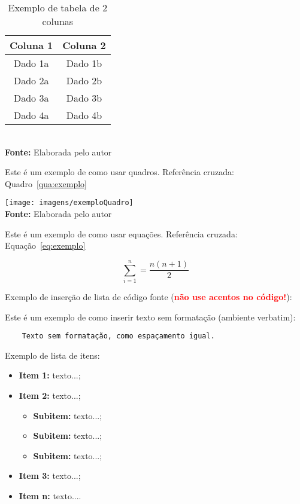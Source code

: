\FloatBarrier
\begin{table}[!htbp]
\centering
\caption{Exemplo de tabela de 2 colunas}
	\begin{tabular}{ c | c }
		\hline
		\textbf{Coluna 1} & \textbf{Coluna 2} \\ \hline
		Dado 1a           & Dado 1b           \\ \hline
		Dado 2a           & Dado 2b           \\ \hline
		Dado 3a           & Dado 3b           \\ \hline
		Dado 4a           & Dado 4b           \\ \hline
	\end{tabular}
	\\ \vspace{0.2cm}
	\textbf{Fonte:} Elaborada pelo autor
	\label{tab:exemplo}
\end{table}
\FloatBarrier


Este é um exemplo de como usar quadros. Referência cruzada: Quadro~\ref{qua:exemplo}

\FloatBarrier
\begin{quadro}[!htbp]
	\centering
	\caption{Exemplo de quadro}
	\texttt{[image: imagens/exemploQuadro]}
	\\\textbf{Fonte:} Elaborada pelo autor
	\label{qua:exemplo}
\end{quadro}
\FloatBarrier


Este é um exemplo de como usar equações. Referência cruzada: Equação~\ref{eq:exemplo}

\begin{equation}
\sum_{i=1}^{n} = \frac{n(n+1)}{2}
\label{eq:exemplo}
\end{equation}


Exemplo de inserção de lista de código fonte (\textbf{\textcolor{red}{não use acentos no código!}}):

 



Este é um exemplo de como inserir texto sem formatação (ambiente verbatim):

\begin{verbatim}
	Texto sem formatação, como espaçamento igual.
\end{verbatim}


Exemplo de lista de itens:

\begin{itemize}
	\item \textbf{Item 1:} texto...;
	\item \textbf{Item 2:} texto...;
    \begin{itemize}
            \item \textbf{Subitem:} texto...;
            \item \textbf{Subitem:} texto...;
            \item \textbf{Subitem:} texto...;
        \end{itemize}
	\item \textbf{Item 3:} texto...;
	\item \textbf{Item n:} texto....
\end{itemize}



